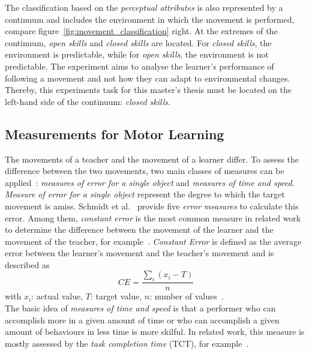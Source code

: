 The classification based on the \textit{perceptual attributes} is also represented by a continuum and includes the environment in which the movement is performed, compare figure~\ref{fig:movement_classification} right. At the extremes of the continuum, \textit{open skills} and \textit{closed skills} are located. For \textit{closed skills}, the environment is predictable, while for\textit{ open skills}, the environment is not predictable. The experiment aims to analyse the learner's performance of following a movement and not how they can adapt to environmental changes. Thereby, this experiments task for this master's thesis must be located on the left-hand side of the continuum: \textit{closed skills}.


\subsection{Measurements for Motor Learning}
\label{section:measures_for_ml}
The movements of a teacher and the movement of a learner differ. To assess the difference between the two movements, two main classes of measures can be applied~\cite{mlbook}: \textit{measures of error for a single object} and \textit{measures of time and speed}.
\textit{Measure of error for a single object} represent the degree to which the target movement is amiss. Schmidt et al.~\cite{mlbook} provide five \textit{error measures} to calculate this error. Among them, \textit{constant error} is the most common measure in related work to determine the difference between the movement of the learner and the movement of the teacher, for example~\cite{perspectivematters,thaichichua,YouMove,onebody,vrdancetrainer,lightguide,physioathome}. \textit{Constant Error} is defined as the average error between the learner's movement and the teacher's movement and is described as
\begin{equation}
	\label{eq:constanterror}
	CE=\frac{\sum_i(x_i-T)}{n}
\end{equation}
with $x_i$: actual value, $T$: target value, $n$: number of values~\cite{mlbook}.\\

The basic idea of \textit{measures of time and speed} is that a performer who can accomplish more in a given amount of time or who can accomplish a given amount of behaviours in less time is more skilful. In related work, this measure is mostly assessed by the \textit{task completion time} (TCT), for example~\cite{perspectivematters,onebody,lightguide}.


